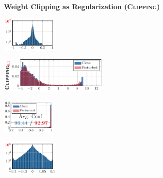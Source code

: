 \documentclass[64pt]{beamer}
\begin{document}
\begin{frame}[t]{\bfseries Weight Clipping as Regularization (\textsc{Clipping})}
\begin{tcolorbox}
\begin{center}
\begin{minipage}[t]{0.24\textwidth}
					\includegraphics[height=1.75cm]{../paper/c10_q81auunfp_nt_original_weights.pdf}
				\end{minipage}
				
				\hspace*{-0.4cm}
				\begin{minipage}[t]{0.48\textwidth}
					\vspace*{3px}
					
					\includegraphics[height=1.75cm]{../paper/c10_q801auunfp_nt_original_logits.pdf}
				\end{minipage}
				\begin{minipage}[t]{0.24\textwidth}
					\vspace*{0px}
					
					\includegraphics[height=1.75cm]{../paper/c10_q801auunfp_nt_original_confidences.pdf}
				\end{minipage}
				\begin{minipage}[t]{0.24\textwidth}
					\vspace*{0px}
					
					\includegraphics[height=1.75cm]{../paper/c10_q801auunfp_nt_original_weights.pdf}
				\end{minipage}
			\end{center}
		\end{tcolorbox}
	\end{frame}
	
\end{document}
